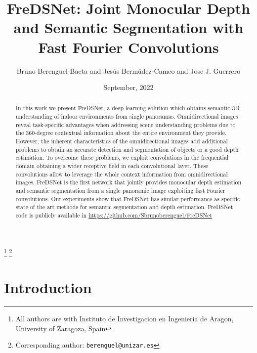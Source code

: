 \documentclass[letterpaper, 10 pt, conference]{ieeeconf}
\title{\Huge FreDSNet: Joint Monocular Depth and Semantic Segmentation with Fast Fourier Convolutions}
\date{September, 2022}
\author{Bruno Berenguel-Baeta and Jesús Bermúdez-Cameo and Jose J. Guerrero}
\begin{document}
\maketitle
\thispagestyle{fancy}

\let\thefootnote\relax\footnote{All authors are with Instituto de Investigacion en Ingenieria de Aragon, University of Zaragoza, Spain}
\let\thefootnote\relax\footnote{Corresponding author: {\tt\small berenguel@unizar.es}}

\begin{abstract}
In this work we present FreDSNet, a deep learning solution which obtains semantic 3D understanding of indoor environments from single panoramas.
Omnidirectional images reveal task-specific advantages when addressing scene understanding problems due to the 360-degree contextual information about the entire environment they provide. However, the inherent characteristics of the omnidirectional images add additional problems to obtain an accurate detection and segmentation of objects or a good depth estimation. To overcome these problems, we exploit convolutions in the frequential domain obtaining a wider receptive field in each convolutional layer. These convolutions allow to leverage the whole context information from omnidirectional images. FreDSNet is the first network that jointly provides monocular depth estimation and semantic segmentation from a single panoramic image exploiting fast Fourier convolutions. Our experiments show that FreDSNet has similar performance as specific state of the art methods for semantic segmentation and depth estimation.
FreDSNet code is publicly available in \url{https://github.com/Sbrunoberenguel/FreDSNet}
\end{abstract}


\section{Introduction}
\end{document}

